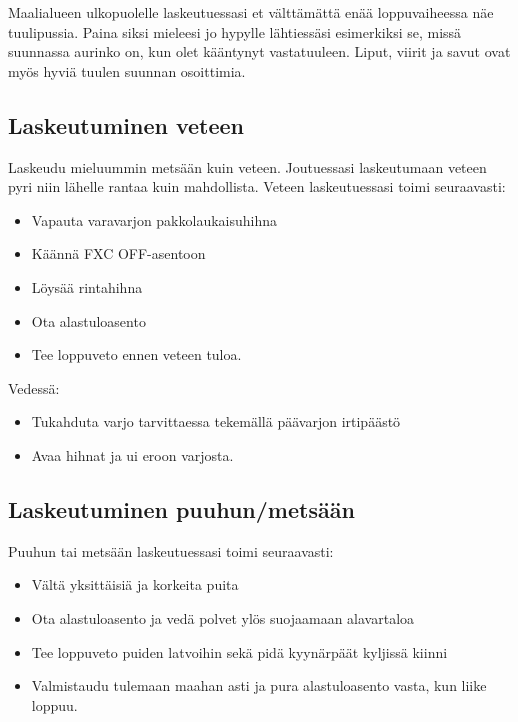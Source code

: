Maalialueen ulkopuolelle laskeutuessasi et välttämättä enää loppuvaiheessa näe tuulipussia. Paina siksi mieleesi jo hypylle lähtiessäsi esimerkiksi se, missä suunnassa aurinko on, kun olet kääntynyt vastatuuleen. Liput, viirit ja savut ovat myös hyviä tuulen suunnan osoittimia. 

\subsection{ Laskeutuminen veteen }
\label{mahdolliset-vaaratilanteet-laskeutuminen-veteen}


Laskeudu mieluummin metsään kuin veteen. Joutuessasi laskeutumaan veteen pyri niin lähelle rantaa kuin mahdollista. Veteen laskeutuessasi toimi seuraavasti: 

\begin{itemize}
\item  Vapauta varavarjon pakkolaukaisuhihna 
\item  Käännä FXC OFF-asentoon 
\item  Löysää rintahihna 
\item  Ota alastuloasento 
\item  Tee loppuveto ennen veteen tuloa. 
\end{itemize}

Vedessä: 

\begin{itemize}
\item  Tukahduta varjo tarvittaessa tekemällä päävarjon irtipäästö 
\item  Avaa hihnat ja ui eroon varjosta. 
\end{itemize}
\subsection{ Laskeutuminen puuhun/metsään }
\label{mahdolliset-vaaratilanteet-laskeutuminen-puuhun-metsaan}


Puuhun tai metsään laskeutuessasi toimi seuraavasti: 

\begin{itemize}
\item  Vältä yksittäisiä ja korkeita puita 
\item  Ota alastuloasento ja vedä polvet ylös suojaamaan alavartaloa 
\item  Tee loppuveto puiden latvoihin sekä pidä kyynärpäät kyljissä kiinni 
\item  Valmistaudu tulemaan maahan asti ja pura alastuloasento vasta, kun liike loppuu. 
\end{itemize}

